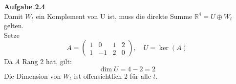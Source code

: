 \documentclass[a4paper,12pt]{article}
\begin{document}
\raggedright
\doublespacing
\noindent\textbf{Aufgabe 2.4} \\
Damit $W_t$ ein Komplement von U ist, muss die direkte Summe $\mathbb{R}^4 = U \oplus W_t$ gelten. \\
Setze
$$A =\begin{pmatrix} 1 & 0 & 1 & 2 \\ 1 & -1 & 2 & 0 \end{pmatrix}, \quad U=\ker(A)$$
Da $A$ Rang 2 hat, gilt:
$$\dim U = 4 - 2= 2$$
Die Dimension von $W_t$ ist offensichtlich 2 für alle $t$.
\end{document}
